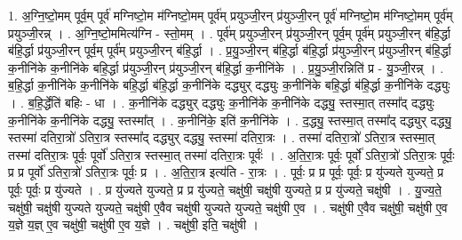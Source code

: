 \documentclass[17pt]{extarticle}
\begin{document}
1. अ॒ग्नि॒ष्टो॒मम् पूर्व॒म् पूर्व॑ मग्निष्टो॒म म॑ग्निष्टो॒मम् पूर्व॑म् प्रयुञ्जी॒रन् प्र॑युञ्जी॒रन् पूर्व॑ मग्निष्टो॒म म॑ग्निष्टो॒मम् पूर्व॑म् प्रयुञ्जी॒रन्न् । . अ॒ग्नि॒ष्टो॒ममित्य॑ग्नि - स्तो॒मम् । . पूर्व॑म् प्रयुञ्जी॒रन् प्र॑युञ्जी॒रन् पूर्व॒म् पूर्व॑म् प्रयुञ्जी॒रन् ब॑हि॒र्द्धा ब॑हि॒र्द्धा प्र॑युञ्जी॒रन् पूर्व॒म् पूर्व॑म् प्रयुञ्जी॒रन् ब॑हि॒र्द्धा । . प्र॒यु॒ञ्जी॒रन् ब॑हि॒र्द्धा ब॑हि॒र्द्धा प्र॑युञ्जी॒रन् प्र॑युञ्जी॒रन् ब॑हि॒र्द्धा क॒नीनि॑के क॒नीनि॑के बहि॒र्द्धा प्र॑युञ्जी॒रन् प्र॑युञ्जी॒रन् ब॑हि॒र्द्धा क॒नीनि॑के । . प्र॒यु॒ञ्जी॒रन्निति॑ प्र - यु॒ञ्जी॒रन्न् । . ब॒हि॒र्द्धा क॒नीनि॑के क॒नीनि॑के बहि॒र्द्धा ब॑हि॒र्द्धा क॒नीनि॑के दद्ध्युर् दद्ध्युः क॒नीनि॑के बहि॒र्द्धा ब॑हि॒र्द्धा क॒नीनि॑के दद्ध्युः । . ब॒हि॒र्द्धेति॑ बहिः - धा । . क॒नीनि॑के दद्ध्युर् दद्ध्युः क॒नीनि॑के क॒नीनि॑के दद्ध्यु॒ स्तस्मा॒त् तस्मा᳚द् दद्ध्युः क॒नीनि॑के क॒नीनि॑के दद्ध्यु॒ स्तस्मा᳚त् । . क॒नीनि॑के॒ इति॑ क॒नीनि॑के । . द॒द्ध्यु॒ स्तस्मा॒त् तस्मा᳚द् दद्ध्युर् दद्ध्यु॒ स्तस्मा॑ दतिरा॒त्रो॑ ऽतिरा॒त्र स्तस्मा᳚द् दद्ध्युर् दद्ध्यु॒ स्तस्मा॑ दतिरा॒त्रः । . तस्मा॑ दतिरा॒त्रो॑ ऽतिरा॒त्र स्तस्मा॒त् तस्मा॑ दतिरा॒त्रः पूर्वः॒ पूर्वो॑ ऽतिरा॒त्र स्तस्मा॒त् तस्मा॑ दतिरा॒त्रः पूर्वः॑ । . अ॒ति॒रा॒त्रः पूर्वः॒ पूर्वो॑ ऽतिरा॒त्रो॑ ऽतिरा॒त्रः पूर्वः॒ प्र प्र पूर्वो॑ ऽतिरा॒त्रो॑ ऽतिरा॒त्रः पूर्वः॒ प्र । . अ॒ति॒रा॒त्र इत्य॑ति - रा॒त्रः । . पूर्वः॒ प्र प्र पूर्वः॒ पूर्वः॒ प्र यु॑ज्यते युज्यते॒ प्र पूर्वः॒ पूर्वः॒ प्र यु॑ज्यते । . प्र यु॑ज्यते युज्यते॒ प्र प्र यु॑ज्यते॒ चक्षु॑षी॒ चक्षु॑षी युज्यते॒ प्र प्र यु॑ज्यते॒ चक्षु॑षी । . यु॒ज्य॒ते॒ चक्षु॑षी॒ चक्षु॑षी युज्यते युज्यते॒ चक्षु॑षी ए॒वैव चक्षु॑षी युज्यते युज्यते॒ चक्षु॑षी ए॒व । . चक्षु॑षी ए॒वैव चक्षु॑षी॒ चक्षु॑षी ए॒व य॒ज्ञे य॒ज्ञ् ए॒व चक्षु॑षी॒ चक्षु॑षी ए॒व य॒ज्ञे । . चक्षु॑षी॒ इति॒ चक्षु॑षी । \newline
\end{document}
